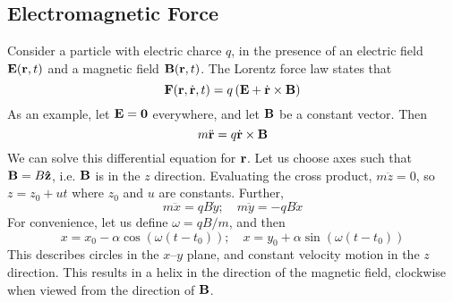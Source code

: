 \subsection{Electromagnetic Force}
Consider a particle with electric charce \(q\), in the presence of an electric field \(\vb E(\vb r, t)\) and a magnetic field \(\vb B(\vb r, t)\). The Lorentz force law states that
\[ \vb F(\vb r, \dot{\vb r}, t) = q\left( \vb E + \dot{\vb r} \times \vb B \right) \]
As an example, let \(\vb E = \vb 0\) everywhere, and let \(\vb B\) be a constant vector. Then
\[ m \ddot{\vb r} = q \dot{\vb r} \times \vb B \]
We can solve this differential equation for \(\vb r\). Let us choose axes such that \(\vb B = B \vu{z}\), i.e. \(\vb B\) is in the \(z\) direction. Evaluating the cross product, \(m \ddot{z} = 0\), so \(z = z_0 + ut\) where \(z_0\) and \(u\) are constants. Further,
\[ m \ddot x = qB\dot y;\quad m \ddot y = -qB\dot x \]
For convenience, let us define \(\omega = qB/m\), and then
\[ x = x_0 - \alpha \cos(\omega(t - t_0));\quad x = y_0 + \alpha \sin(\omega(t - t_0)) \]
This describes circles in the \(x\)--\(y\) plane, and constant velocity motion in the \(z\) direction. This results in a helix in the direction of the magnetic field, clockwise when viewed from the direction of \(\vb B\).
